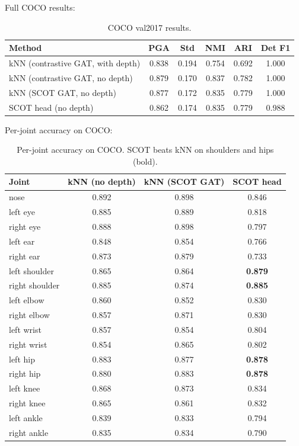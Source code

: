Full COCO results:

\begin{table}[H]
\centering
\footnotesize
\begin{tabular}{lccccc}
\toprule
Method & PGA & Std & NMI & ARI & Det F1 \\
\midrule
kNN (contrastive GAT, with depth) & 0.838 & 0.194 & 0.754 & 0.692 & 1.000 \\
kNN (contrastive GAT, no depth) & 0.879 & 0.170 & 0.837 & 0.782 & 1.000 \\
kNN (SCOT GAT, no depth) & 0.877 & 0.172 & 0.835 & 0.779 & 1.000 \\
SCOT head (no depth) & 0.862 & 0.174 & 0.835 & 0.779 & 0.988 \\
\bottomrule
\end{tabular}
\caption{COCO val2017 results.}
\end{table}

Per-joint accuracy on COCO:

\begin{table}[H]
\centering
\footnotesize
\begin{tabular}{lccc}
\toprule
Joint & kNN (no depth) & kNN (SCOT GAT) & SCOT head \\
\midrule
nose & 0.892 & 0.898 & 0.846 \\
left eye & 0.885 & 0.889 & 0.818 \\
right eye & 0.888 & 0.898 & 0.797 \\
left ear & 0.848 & 0.854 & 0.766 \\
right ear & 0.873 & 0.879 & 0.733 \\
left shoulder & 0.865 & 0.864 & \textbf{0.879} \\
right shoulder & 0.885 & 0.874 & \textbf{0.885} \\
left elbow & 0.860 & 0.852 & 0.830 \\
right elbow & 0.857 & 0.871 & 0.830 \\
left wrist & 0.857 & 0.854 & 0.804 \\
right wrist & 0.854 & 0.865 & 0.802 \\
left hip & 0.883 & 0.877 & \textbf{0.878} \\
right hip & 0.880 & 0.883 & \textbf{0.878} \\
left knee & 0.868 & 0.873 & 0.834 \\
right knee & 0.865 & 0.861 & 0.832 \\
left ankle & 0.839 & 0.833 & 0.794 \\
right ankle & 0.835 & 0.834 & 0.790 \\
\bottomrule
\end{tabular}
\caption{Per-joint accuracy on COCO. SCOT beats kNN on shoulders and hips (bold).}
\end{table}


